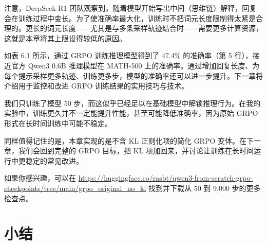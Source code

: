 注意，DeepSeek-R1 团队观察到，随着模型开始写出中间（思维链）解释，回复会在训练过程中变长。为了使准确率最大化，训练时不把词元长度限制得太紧是合理的。更长的词元长度——尤其是与多条采样轨迹结合时——需要更多计算资源，这就是本章将其上限设得较低的原因。

如表 6.1 所示，通过 GRPO 训练推理模型得到了 47.4\% 的准确率（第 5 行），接近官方 Qwen3 0.6B 推理模型在 MATH-500 上的准确率。通过增加回复长度、为每个提示采样更多轨迹、训练更多步，模型的准确率还可以进一步提升。下一章将介绍用于监控和改进 GRPO 训练结果的实用技巧与技术。

我们只训练了模型 50 步，而这似乎已经足以在基础模型中解锁推理行为。在我的实验中，训练更久并不一定能提升性能，甚至可能降低准确率，因为原始 GRPO 形式在长时间训练中可能不稳定。

同样值得记住的是，本章实现的是不含 KL 正则化项的简化 GRPO 变体。在下一章，我们会回到完整的 GRPO 目标，把 KL 项加回来，并讨论让训练在长时间运行中更稳定的常见改进。

如果你感兴趣，可以在 \href{https://huggingface.co/rasbt/qwen3-from-scratch-grpo-checkpoints/tree/main/grpo\_original\_no\_kl}{https://huggingface.co/rasbt/qwen3-from-scratch-grpo-checkpoints/tree/main/grpo\_original\_no\_kl} 找到并下载从 50 到 9,000 步的更多检查点。

\section{小结}

